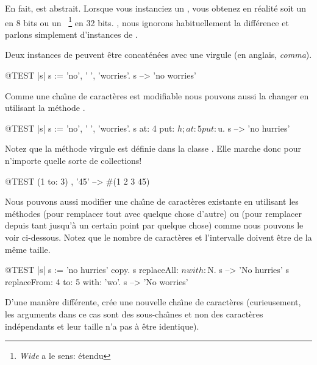 \documentclass[a4paper,10pt,twoside]{book}
\begin{document}
En fait,  est abstrait.
Lorsque vous instanciez un , vous obtenez en r\'ealit\'e soit
un  en 8 bits ou un ~\footnote{\emph{Wide} a le sens: \'etendu} en 32 bits.
, nous ignorons habituellement la diff\'erence
et parlons simplement d'instances de .

Deux instances de  peuvent \^etre concat\'en\'ees avec une virgule (en anglais, \emph{comma}).
\begin{code}{@TEST |s|}
s := 'no', ' ', 'worries'.
s -->  'no worries'
\end{code}

Comme une cha\^{\i}ne de caract\`eres est modifiable nous pouvons aussi la
changer en utilisant la m\'ethode .

\begin{code}{@TEST |s| s := 'no', ' ', 'worries'.}
s at: 4 put: $h; at: 5 put: $u.
s --> 'no hurries'
\end{code}

Notez que la m\'ethode virgule est d\'efinie dans la classe .
Elle marche donc pour n'importe quelle sorte de collections!
\begin{code}{@TEST}
(1 to: 3) , '45' --> #(1 2 3 $4 $5)
\end{code}

Nous pouvons aussi modifier une cha\^{\i}ne de caract\`eres existante
en utilisant les m\'ethodes  
(pour remplacer tout avec quelque chose d'autre)
ou 
(pour remplacer depuis tant jusqu'\`a un certain point par quelque chose)
comme nous pouvons le voir ci-dessous. Notez que le nombre de caract\`eres
et l'intervalle doivent \^etre de la m\^eme taille.

\begin{code}{@TEST |s| s := 'no hurries' copy.}
s replaceAll: $n with: $N.
s --> 'No hurries'
s replaceFrom: 4 to: 5 with: 'wo'.
s --> 'No worries'
\end{code}

D'une mani\`ere diff\'erente,  cr\'ee 
une nouvelle cha\^{\i}ne de caract\`eres (curieusement, les arguments dans ce cas sont des sous-cha\^{\i}nes et non des caract\`eres ind\'ependants et leur taille n'a pas \`a \^etre identique).
\end{document}
